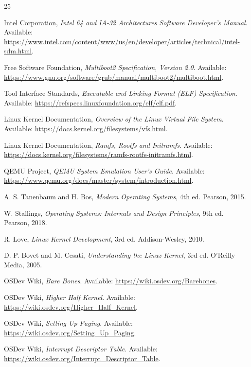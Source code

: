 \documentclass[conference]{IEEEtran}
\begin{document}
\begin{thebibliography}{25}

Intel Corporation,
\emph{Intel 64 and IA-32 Architectures Software Developer's Manual}.
Available: \url{https://www.intel.com/content/www/us/en/developer/articles/technical/intel-sdm.html}.

Free Software Foundation,
\emph{Multiboot2 Specification, Version 2.0}.
Available: \url{https://www.gnu.org/software/grub/manual/multiboot2/multiboot.html}.

Tool Interface Standards,
\emph{Executable and Linking Format (ELF) Specification}.
Available: \url{https://refspecs.linuxfoundation.org/elf/elf.pdf}.

Linux Kernel Documentation,
\emph{Overview of the Linux Virtual File System}.
Available: \url{https://docs.kernel.org/filesystems/vfs.html}.

Linux Kernel Documentation,
\emph{Ramfs, Rootfs and Initramfs}.
Available: \url{https://docs.kernel.org/filesystems/ramfs-rootfs-initramfs.html}.

QEMU Project,
\emph{QEMU System Emulation User's Guide}.
Available: \url{https://www.qemu.org/docs/master/system/introduction.html}.

A. S. Tanenbaum and H. Bos,
\emph{Modern Operating Systems},
4th ed. Pearson, 2015.

W. Stallings,
\emph{Operating Systems: Internals and Design Principles},
9th ed. Pearson, 2018.

R. Love,
\emph{Linux Kernel Development},
3rd ed. Addison-Wesley, 2010.

D. P. Bovet and M. Cesati,
\emph{Understanding the Linux Kernel},
3rd ed. O'Reilly Media, 2005.

OSDev Wiki,
\emph{Bare Bones}.
Available: \url{https://wiki.osdev.org/Barebones}.

OSDev Wiki,
\emph{Higher Half Kernel}.
Available: \url{https://wiki.osdev.org/Higher_Half_Kernel}.

OSDev Wiki,
\emph{Setting Up Paging}.
Available: \url{https://wiki.osdev.org/Setting_Up_Paging}.

OSDev Wiki,
\emph{Interrupt Descriptor Table}.
Available: \url{https://wiki.osdev.org/Interrupt_Descriptor_Table}.


\end{thebibliography}
\end{document}
